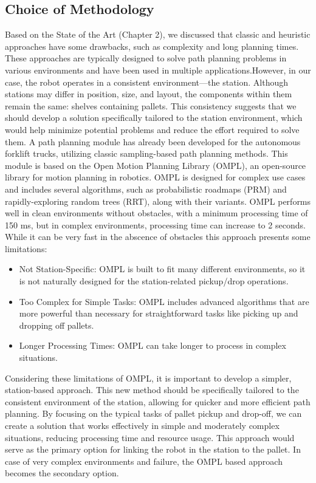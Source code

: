 \subsection{Choice of Methodology}
Based on the State of the Art (Chapter 2), we discussed that classic and heuristic approaches have some drawbacks, 
such as complexity and long planning times. These approaches are typically designed to solve path planning problems 
in various environments and have been used in multiple applications.However, in our case, the robot operates in a 
consistent environment—the station. Although stations may differ in 
position, size, and layout, the components within them remain the same: shelves containing pallets. 
This consistency suggests that we should 
develop a solution specifically tailored to the station environment, which would help minimize potential problems 
and reduce the effort required to solve them. A path planning module has already been developed for the autonomous 
forklift trucks, utilizing classic sampling-based path planning methods. This module is based on the Open Motion 
Planning Library (OMPL), an open-source library for motion planning in robotics. OMPL is designed for complex use 
cases and includes several algorithms, such as probabilistic roadmaps (PRM) and rapidly-exploring random trees 
(RRT), along with their variants. OMPL performs well in clean environments without obstacles, with a minimum 
processing time of 150 ms, but in complex environments, processing time can increase to 2 seconds.
While it can be very fast in the abscence of obstacles this approach presents some limitations:
\begin{itemize}
    \item Not Station-Specific: OMPL is built to fit many different environments, so it is not naturally designed 
    for the station-related pickup/drop operations.

    \item Too Complex for Simple Tasks: OMPL includes advanced algorithms that are more powerful than necessary 
    for straightforward tasks like picking up and dropping off pallets.
    
    \item Longer Processing Times: OMPL can take longer to process in complex situations. 
\end{itemize}

Considering these limitations of OMPL, it is important to develop a simpler, station-based approach. 
This new method should be specifically tailored to the consistent environment of the 
station, allowing for quicker and more efficient path planning. By focusing on the typical tasks of pallet 
pickup and drop-off, we can create a solution that works effectively in simple and moderately complex 
situations, reducing processing time and resource usage. This approach would serve as the primary option 
for linking the robot in the station to the pallet. In case of very complex environments and failure,
the OMPL based approach becomes the secondary option. 

